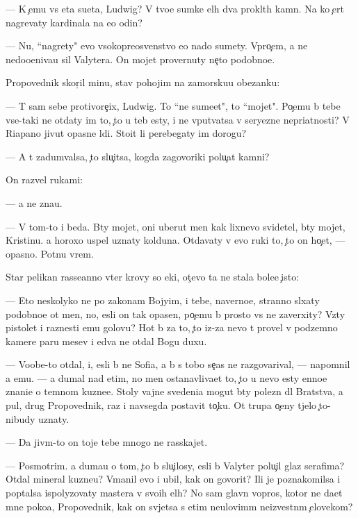 \documentclass[10pt]{book}
\begin{document}
— K {\c}emu vs{\ia} eta su{\y}eta, Ludwig? V tvo{\y}e{\y} sumke {\q}el{\yi}h dva prokl{\ia}t{\yi}h kamn{\ia}. Na ko{\y} {\c}ert nagrevaty kardinala na {\y}e{\x}o odin?

— Nu, ``nagrety" {\y}evo v{\yi}sokopreosv{\ia}{\x}enstvo {\y}e{\x}o nado sumety. Vpro{\c}em, {\y}a ne nedoo{\q}eniva{\y}u sil{\yi} Valytera. On mojet provernuty ne{\c}to podobno{\y}e.

Propovednik skor{\c}il minu, stav pohojim na zamorsku{\y}u obez{\y}anku:

— T{\yi} sam sebe protivore{\c}ix, Ludwig. To ``ne sume{\y}et", to ``mojet". Po{\c}emu b{\yi} tebe vse-taki ne otdaty im to, {\c}to u teb{\ia} {\y}esty, i ne vput{\yi}vatsa v seryezn{\yi}{\y}e nepri{\y}atnosti? V Riapano jivut opasn{\yi}{\y}e l{\iu}di. Sto{\y}it li perebegaty im dorogu?

— A t{\yi} zadum{\yi}valsa, {\c}to slu{\c}itsa, kogda zagovor{\x}iki polu{\c}at kamni?

On razvel rukami:

— {\Y}a ne zna{\y}u.

— V tom-to i beda. B{\yi}ty mojet, oni uberut men{\ia} kak lixnevo svidetel{\ia}, b{\yi}ty mojet, Kristinu. {\Y}a horoxo uspel uznaty kolduna. Otdavaty v {\y}evo ruki to, {\c}to on ho{\c}et, — opasno. Pot{\ia}nu vrem{\ia}.

Star{\yi}{\y} pelikan rasse{\y}anno v{\yi}ter krovy so {\x}eki, ot{\c}evo ta ne stala bole{\y}e {\c}isto{\y}:

— Eto neskolyko ne po zakonam Bojyim, i tebe, naverno{\y}e, stranno sl{\yi}xaty podobno{\y}e ot men{\ia}, no, {\y}esli on tak opasen, po{\c}emu b{\yi} prosto vs{\e} ne zaverxity? Vz{\ia}ty pistolet i raznesti {\y}emu golovu? Hot{\ia} b{\yi} za to, {\c}to iz-za nevo t{\yi} provel v podzemno{\y} kamere paru mes{\ia}{\q}ev i {\y}edva ne otdal Bogu duxu.

— Voob{\x}e-to otdal, i, {\y}esli b{\yi} ne Sofi{\y}a, {\y}a b{\yi} s tobo{\y} se{\y}{\c}as ne razgovarival, — napomnil {\y}a {\y}emu. — {\Y}a dumal nad etim, no men{\ia} ostanavliva{\y}et to, {\c}to u nevo {\y}esty {\q}enno{\y}e znani{\y}e o temnom kuzne{\q}e. Stoly vajn{\yi}{\y}e svedeni{\y}a mogut b{\yi}ty polezn{\yi} dl{\ia} Bratstva, a pul{\ia}, drug Propovednik, raz i navsegda postavit to{\c}ku. Ot trupa o{\c}eny t{\ia}jelo {\c}to-nibudy uznaty.

— Da jiv{\yi}m-to on toje tebe mnogo ne rasskajet.

— Posmotrim. {\Y}a duma{\y}u o tom, {\c}to b{\yi} slu{\c}ilosy, {\y}esli b{\yi} Valyter polu{\c}il glaz serafima? Otdal mineral kuzne{\q}u? V{\yi}manil {\y}evo i ubil, kak on govorit? Ili je poznakomilsa i pop{\yi}talsa ispolyzovaty mastera v svo{\y}ih {\q}el{\ia}h? No sam{\yi}{\y} glavn{\yi}{\y} vopros, kotor{\yi}{\y} ne da{\y}et mne poko{\y}a, Propovednik, kak on sv{\ia}jetsa s etim neulovim{\yi}m ne{\y}izvestn{\yi}m {\c}elovekom?
\end{document}
